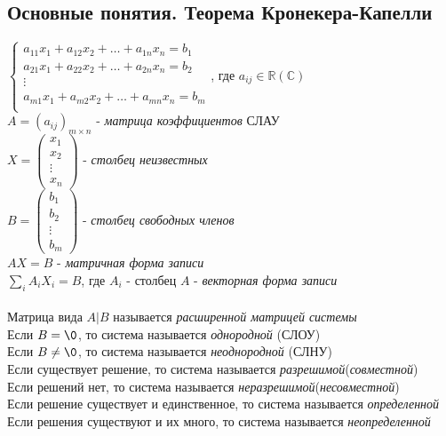 \documentclass[12pt]{article}
\begin{document}
\subsection{Основные понятия. Теорема Кронекера-Капелли}
$\left\{\begin{array}{cc}
     a_{11} x_1 + a_{12}x_2 + \ldots + a_{1n}x_n = b_1 \\
     a_{21} x_1 + a_{22}x_2 + \ldots + a_{2n}x_n = b_2 \\
     \vdots\\
     a_{m1} x_1 + a_{m2}x_2 + \ldots + a_{mn}x_n = b_m \\
\end{array}\right.$, где $a_{ij} \in \mathbb{R}(\mathbb{C})$\\
$A = (a_{ij})_{m\times n}$ - \textit{матрица коэффициентов} СЛАУ\\
$X = \begin{pmatrix}
x_1\\x_2\\\vdots\\ x_n
\end{pmatrix}$ - \textit{столбец неизвестных}\\
$B = \begin{pmatrix}
b_1\\b_2\\\vdots\\ b_m
\end{pmatrix}$ - \textit{столбец свободных членов}\\
$AX=B$ - \textit{матричная форма записи}\\
$\sum_{i}A_iX_i = B$, где $A_i$ - столбец $A$ - \textit{векторная форма записи}\\\\
Матрица вида $A|B$ называется \textit{расширенной матрицей системы}\\
Если $B = \0$, то система называется \textit{однородной} (СЛОУ)\\
Если $B \neq \0$, то система называется \textit{неоднородной} (СЛНУ)\\
Если существует решение, то система называется \textit{разрешимой}(\textit{совместной})\\
Если решений нет, то система называется \textit{неразрешимой}(\textit{несовместной})\\
Если решение существует и единственное, то система называется \textit{определенной}\\
Если решения существуют и их много, то система называется \textit{неопределенной}\\
\end{document}
